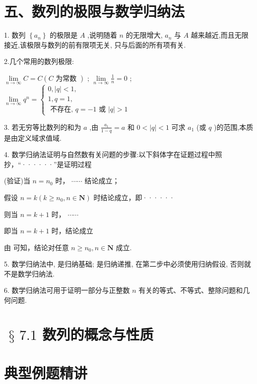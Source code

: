 \section*{五、数列的极限与数学归纳法}

1. 数列 $\left\{  {a}_{n}\right\}$ 的极限是 $A$ ,说明随着 $n$ 的无限增大, ${a}_{n}$ 与 $A$ 越来越近,而且无限接近,该极限与数列的前有限项无关, 只与后面的所有项有关.

2.几个常用的数列极限:

   $\mathop{\lim }\limits_{{n \rightarrow  \infty }}C = C\left( {C\text{ 为常数 }}\right)$ ;    $\mathop{\lim }\limits_{{n \rightarrow  \infty }}\frac{1}{n} = 0$ ;    $\mathop{\lim }\limits_{{n \rightarrow  \infty }}{q}^{n} = \left\{  \begin{array}{l} 0,\left| q\right|  < 1, \\  1,q = 1, \\  \text{ 不存在, }q =  - 1\text{ 或 }\left| q\right|  > 1 \end{array}\right.$

3. 若无穷等比数列的和为 $a$ ,由 $\frac{{a}_{1}}{1 - q} = a$ 和 $0 < \left| q\right|  < 1$ 可求 ${a}_{1}$ (或 $q$ )的范围,本质是由定义域求值域.

4. 数学归纳法证明与自然数有关问题的步骤:以下斜体字在证题过程中照抄，“······”是证明过程

   (验证)当 $n = {n}_{0}$ 时， $\cdots \cdots$ 结论成立；

   假设 $n = k\left( {k \geq  {n}_{0},n \in  \mathbf{N}}\right)$ 时结论成立，即······

则当 $n = k + 1$ 时， $\cdots \cdots$

即当 $n = k + 1$ 时，结论成立

由    可知，结论对任意 $n \geq  {n}_{0},n \in  \mathbf{N}$ 成立.

5. 数学归纳法中,   是归纳基础;   是归纳递推, 在第二步中必须使用归纳假设, 否则就不是数学归纳法.

6. 数学归纳法可用于证明一部分与正整数 $n$ 有关的等式、不等式、整除问题和几何问题.

\section*{$\text{ § }{7.1}$ 数列的概念与性质}

\section*{典型例题精讲}

